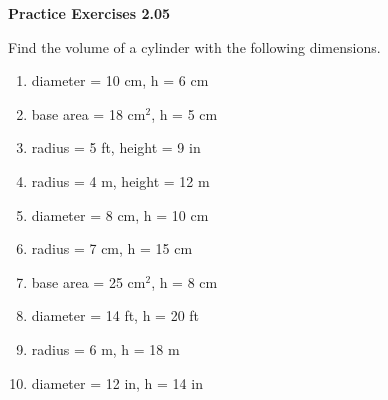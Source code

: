 \vspace{0.3ex}
\noindent\textbf{Practice Exercises 2.05}

\vspace{0.2ex}

Find the volume of a cylinder with the following dimensions.
\begin{multicols}{2}
\begin{enumerate}[noitemsep, label = \color{blue}\arabic*. ]
\item diameter = 10 cm, h = 6 cm
\item base area = 18 cm\(^{2}\), h = 5 cm
\item radius = 5 ft, height = 9 in
    \item radius = 4 m, height = 12 m
    \item diameter = 8 cm, h = 10 cm
    \item radius = 7 cm, h = 15 cm
    \item base area = 25 cm\(^{2}\), h = 8 cm
    \item diameter = 14 ft, h = 20 ft
    \item radius = 6 m, h = 18 m
    \item diameter = 12 in, h = 14 in 
\end{enumerate}
\end{multicols}
